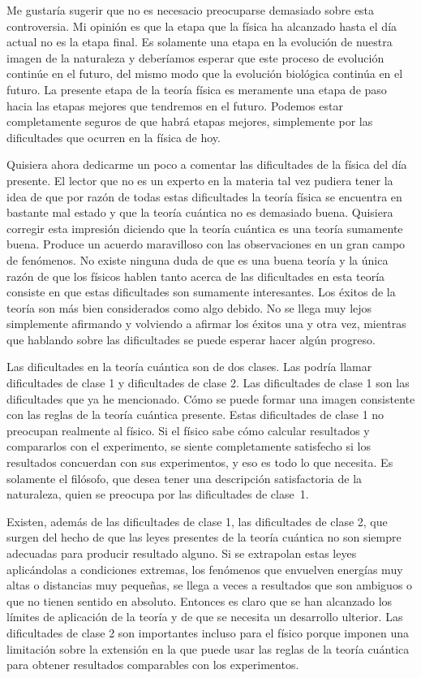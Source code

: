 \documentclass[a4paper, 12pt]{article}
\begin{document}
Me gustaría sugerir que no es necesacio preocuparse demasiado sobre esta controversia. Mi opinión es que la etapa que la física ha alcanzado hasta el día actual no es la etapa final. Es solamente una etapa en la evolución de nuestra imagen de la naturaleza y deberíamos esperar que este proceso de evolución continúe en el futuro, del mismo modo que la evolución biológica continúa en el futuro. La presente etapa de la teoría física es meramente una etapa de paso hacia las etapas mejores que tendremos en el futuro. Podemos estar completamente seguros de que habrá etapas mejores, simplemente por las dificultades que ocurren en la física de hoy.

Quisiera ahora dedicarme un poco a comentar las dificultades de la física del día presente. El lector que no es un experto en la materia tal vez pudiera tener la idea de que por razón de todas estas dificultades la teoría física se encuentra en bastante mal estado y que la teoría cuántica no es demasiado buena. Quisiera corregir esta impresión diciendo que la teoría cuántica es una teoría sumamente buena. Produce un acuerdo maravilloso con las observaciones en un gran campo de fenómenos. No existe ninguna duda de que es una buena teoría y la única razón de que los físicos hablen tanto acerca de las dificultades en esta teoría consiste en que estas dificultades son sumamente interesantes. Los éxitos de la teoría son más bien considerados como algo debido. No se llega muy lejos simplemente afirmando y volviendo a afirmar los éxitos una y otra vez, mientras que hablando sobre las dificultades se puede esperar hacer algún progreso.

Las dificultades en la teoría cuántica son de dos clases. Las podría llamar dificultades de clase 1 y dificultades de clase 2. Las dificultades de clase 1 son las dificultades que ya he mencionado. Cómo se puede formar una imagen consistente con las reglas de la teoría cuántica presente. Estas dificultades de clase 1 no preocupan realmente al físico. Si el físico sabe cómo calcular resultados y compararlos con el experimento, se siente completamente satisfecho si los resultados concuerdan con sus experimentos, y eso es todo lo que necesita. Es solamente el filósofo, que desea tener una descripción satisfactoria de la naturaleza, quien se preocupa por las dificultades de clase~1.

Existen, además de las dificultades de clase 1, las dificultades de clase 2, que surgen del hecho de que las leyes presentes de la teoría cuántica no son siempre adecuadas para producir resultado alguno. Si se extrapolan estas leyes aplicándolas a condiciones extremas, los fenómenos que envuelven energías muy altas o distancias muy pequeñas, se llega a veces a resultados que son ambiguos o que no tienen sentido en absoluto. Entonces es claro que se han alcanzado los límites de aplicación de la teoría y de que se necesita un desarrollo ulterior. Las dificultades de clase 2 son importantes incluso para el físico porque imponen una limitación sobre la extensión en la que puede usar las reglas de la teoría cuántica para obtener resultados comparables con los experimentos.
\end{document}
